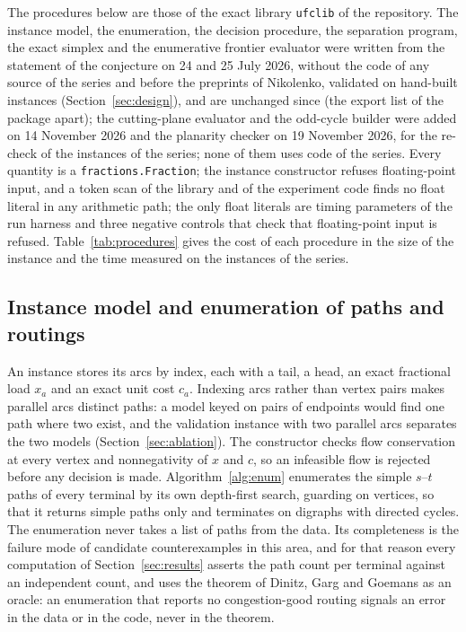\documentclass[11pt]{article}
\theoremstyle{remark}
\begin{document}
The procedures below are those of the exact library \texttt{ufclib} of the repository. The instance model, the enumeration, the decision
procedure, the separation program, the exact simplex and the enumerative frontier evaluator were written from the statement of the
conjecture on 24 and 25 July 2026, without the code of any source of the series and before the preprints of Nikolenko, validated on hand-built instances
(Section~\ref{sec:design}), and are unchanged since (the export list of the package apart); the cutting-plane evaluator and the odd-cycle builder
were added on 14 November 2026 and the planarity checker on 19 November 2026, for the re-check of the instances of the series; none of them uses code of the series.
Every quantity is a \texttt{fractions.Fraction}; the instance constructor refuses
floating-point input, and a token scan of the library and of the experiment code finds no float literal in any arithmetic path; the only float literals
are timing parameters of the run harness and three negative controls that check that floating-point input is refused.
Table~\ref{tab:procedures} gives the cost of each procedure in the size of the instance and the time measured on the instances of the series.

\subsection{Instance model and enumeration of paths and routings}
\label{sec:enum}

An instance stores its arcs by index, each with a tail, a head, an exact fractional load $x_a$ and an exact unit cost $c_a$.
Indexing arcs rather than vertex pairs makes parallel arcs distinct paths: a model keyed on pairs of endpoints would find one path
where two exist, and the validation instance with two parallel arcs separates the two models (Section~\ref{sec:ablation}). The
constructor checks flow conservation at every vertex and nonnegativity of $x$ and $c$, so an infeasible flow is rejected before any
decision is made. Algorithm~\ref{alg:enum} enumerates the simple $s$--$t$ paths of every terminal by its own depth-first search,
guarding on vertices, so that it returns simple paths only and terminates on digraphs with directed cycles. The enumeration never takes a
list of paths from the data. Its completeness is the failure mode of candidate counterexamples in this area, and for that reason
every computation of Section~\ref{sec:results} asserts the path count per terminal against an independent count, and uses the
theorem of Dinitz, Garg and Goemans as an oracle: an enumeration that reports no congestion-good routing signals an error in the data
or in the code, never in the theorem.
\end{document}
